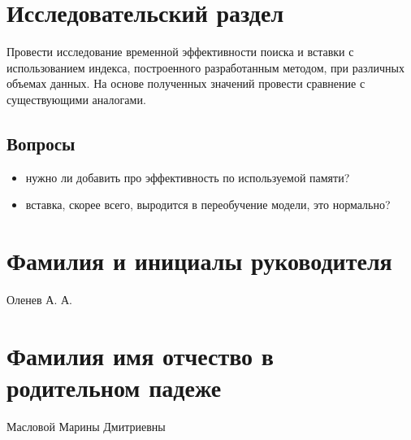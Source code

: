 \documentclass{bmstu}
\begin{document}
\section*{Исследовательский раздел}

Провести исследование временной эффективности поиска и вставки с использованием
индекса, построенного разработанным методом, при различных объемах данных. На
основе полученных значений провести сравнение с существующими аналогами.

\subsection*{Вопросы}
\begin{itemize}
    \item нужно ли добавить про эффективность по используемой памяти?
    \item вставка, скорее всего, выродится в переобучение модели, это нормально?
\end{itemize}

\section*{Фамилия и инициалы руководителя}

Оленев А. А.

\section*{Фамилия имя отчество в родительном падеже}

Масловой Марины Дмитриевны
\end{document}
